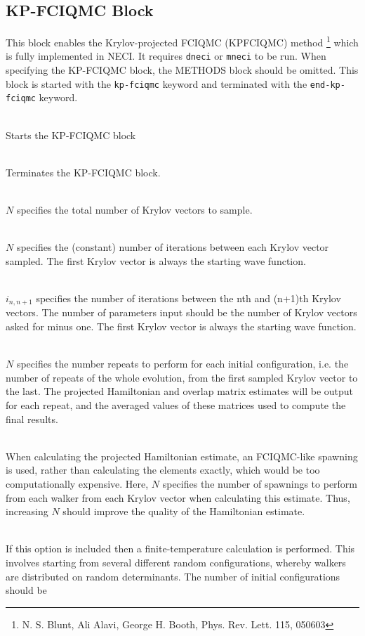 \documentclass[a4paper,notitlepage,dvipsnames]{scrreprt}
\newcommand\codeitem[1]{\needspace{1.5\baselineskip}\item[\textnormal{\ttfamily #1 \nopagebreak}] \hfill \\ \nopagebreak}
\begin{document}
  \subsection{KP-FCIQMC Block}
  This block enables the Krylov-projected FCIQMC (KPFCIQMC) method \footnote{N. S. Blunt, Ali
    Alavi, George H. Booth, Phys. Rev. Lett. 115, 050603} which is fully implemented
  in NECI. It requires \texttt{dneci} or \texttt{mneci} to be run. When
  specifying the KP-FCIQMC block, the METHODS block should be omitted. This
  block is started with the \texttt{kp-fciqmc} keyword and terminated with
  the \texttt{end-kp-fciqmc} keyword.
  \begin{description}
    \codeitem{kp-fciqmc}
    Starts the KP-FCIQMC block
    \codeitem{end-kp-fciqmc}
    Terminates the KP-FCIQMC block.
    \codeitem{num-krylov-vecs $N$}
    $N$ specifies the total number of Krylov vectors to sample.
    \codeitem{num-iters-between-vecs $N$}
    $N$ specifies the (constant) number of iterations between each Krylov
    vector sampled. The first Krylov vector is always the starting wave
    function.
    \codeitem{num-iters-between-vecs-vary $i_{12}$, $i_{23}$, $i_{34}$...}
    $i_{n,n+1}$ specifies the number of iterations between the nth and
    (n+1)th Krylov vectors. The number of parameters input should be
    the number of Krylov vectors asked for minus one. The first Krylov
    vector is always the starting wave function.
    \codeitem{num-repeats-per-init-config $N$}
    $N$ specifies the number repeats to perform for each initial
    configuration, i.e. the number of repeats of the whole evolution,
    from the first sampled Krylov vector to the last. The projected
    Hamiltonian and overlap matrix estimates will be output for each
    repeat, and the averaged values of these matrices used to compute
    the final results.
    \codeitem{averagemcexcits-hamil $N$}
    When calculating the projected Hamiltonian estimate, an FCIQMC-like
    spawning is used, rather than calculating the elements exactly,
    which would be too computationally expensive. Here, $N$ specifies the
    number of spawnings to perform from each walker from each Krylov
    vector when calculating this estimate. Thus, increasing $N$ should
    improve the quality of the Hamiltonian estimate.
    \codeitem{finite-temperature}
    If this option is included then a finite-temperature calculation is
    performed. This involves starting from several different random
    configurations, whereby walkers are distributed on random
    determinants. The number of initial configurations should be

\end{description}
\end{document}
